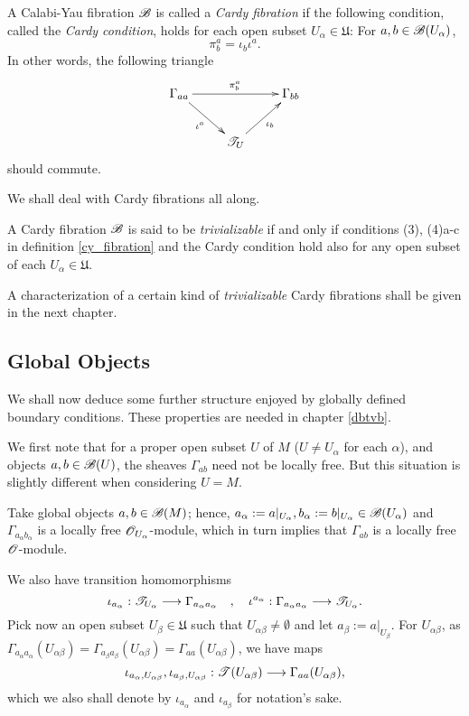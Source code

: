 \begin{defi}\label{cardy_fib}
  A Calabi-Yau fibration $\mathscr{B}$ is called a \emph{Cardy fibration}
  if the following condition, called the \emph{Cardy
    condition}, holds for each open subset $U_\alpha \in
  \mathfrak{U}$: For $a,b\in \mathscr{B}(U_\alpha )$,
$$\pi^a_b=\iota_b\iota^a.$$
In other words, the following triangle
$$
\xymatrix{
  \Gamma_{aa} \ar[dr]_{\iota^a}\ar[rr]^{\pi^a_b} & & \Gamma_{bb} \\
  & \scr{T}_U \ar[ur]_{\iota_b} & }
$$
should commute.
\end{defi}

We shall deal with Cardy fibrations all along.

\begin{defi}
  A Cardy fibration $\mathscr{B}$ is said to be \emph{trivializable} if
  and only if conditions (3), (4)a-c in definition \ref{cy_fibration}
  and the Cardy condition hold also for any open subset of each
  $U_\alpha \in \mathfrak{U}$.
\end{defi}

A characterization of a certain kind of \emph{trivializable} Cardy
fibrations shall be given in the next chapter.

\subsection{Global Objects}

We shall now deduce some further structure enjoyed by globally defined
boundary conditions. These properties are needed in chapter \ref{dbtvb}.

We first note that for a proper open subset $U$ of $M$ ($U\neq
U_\alpha$ for each $\alpha$), and objects $a,b\in \mathscr{B}(U)$, the
sheaves $\Gamma_{ab}$ need not be locally free. But this situation is
slightly different when considering $U=M$.

Take global objects $a,b\in \mathscr{B}(M)$; hence, $a_\alpha
:=a|_{U_\alpha}, b_\alpha :=b|_{U_\alpha}\in \mathscr{B}(U_\alpha )$ and
$\Gamma_{a_\alpha b_\alpha }$ is a locally free $\mathscr{O}_{U_\alpha
}$-module, which in turn implies that $\Gamma_{ab}$ is a locally free
$\mathscr{O}$-module.

We also have transition homomorphisms
$$\iota_{a_\alpha}:\mathscr{T}_{U_\alpha }\longrightarrow \Gamma_{a_\alpha a_\alpha }\quad , \quad \iota^{a_\alpha}:\Gamma_{a_\alpha a_\alpha }\longrightarrow \mathscr{T}_{U_\alpha }.$$
Pick now an open subset $U_\beta \in \mathfrak{U}$ such that
$U_{\alpha \beta }\neq \emptyset$ and let $a_\beta
:=a|_{U_\beta}$. For $U_{\alpha \beta }$, as $\Gamma_{a_\alpha
  a_\alpha }(U_{\alpha \beta })=\Gamma_{a_\beta a_\beta }(U_{\alpha
  \beta })=\Gamma_{aa}(U_{\alpha \beta})$, we have maps
$$
\iota_{a_\alpha ,U_{\alpha \beta}},\iota_{a_\beta ,U_{\alpha \beta}} :
\mathscr{T}(U_{\alpha \beta })\longrightarrow \Gamma_{aa}(U_{\alpha \beta
}),
$$
which we also shall denote by $\iota_{a_\alpha }$ and $\iota_{a_\beta
}$ for notation's sake.


